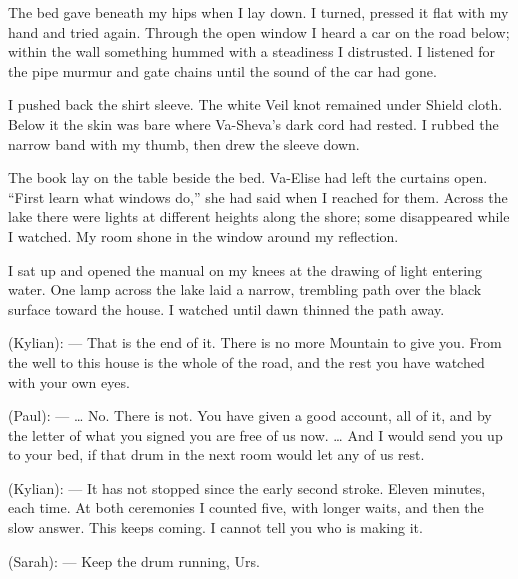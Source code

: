 The bed gave beneath my hips when I lay down. I turned, pressed it flat with my hand and tried again. Through the open window I heard a car on the road below; within the wall something hummed with a steadiness I distrusted. I listened for the pipe murmur and gate chains until the sound of the car had gone.\par

I pushed back the shirt sleeve. The white Veil knot remained under Shield cloth. Below it the skin was bare where Va-Sheva's dark cord had rested. I rubbed the narrow band with my thumb, then drew the sleeve down.\par

The book lay on the table beside the bed. Va-Elise had left the curtains open. ``First learn what windows do,'' she had said when I reached for them. Across the lake there were lights at different heights along the shore; some disappeared while I watched. My room shone in the window around my reflection.\par

I sat up and opened the manual on my knees at the drawing of light entering water. One lamp across the lake laid a narrow, trembling path over the black surface toward the house. I watched until dawn thinned the path away.\par

\ornament

\begin{room}

(Kylian): --- That is the end of it. There is no more Mountain to give you. From the well to this house is the whole of the road, and the rest you have watched with your own eyes.

(Paul): --- \ldots{} No. There is not. You have given a good account, all of it, and by the letter of what you signed you are free of us now. \ldots{} And I would send you up to your bed, if that drum in the next room would let any of us rest.

(Kylian): --- It has not stopped since the early second stroke. Eleven minutes, each time. At both ceremonies I counted five, with longer waits, and then the slow answer. This keeps coming. I cannot tell you who is making it.

(Sarah): --- Keep the drum running, Urs.

\end{room}

\ornament
